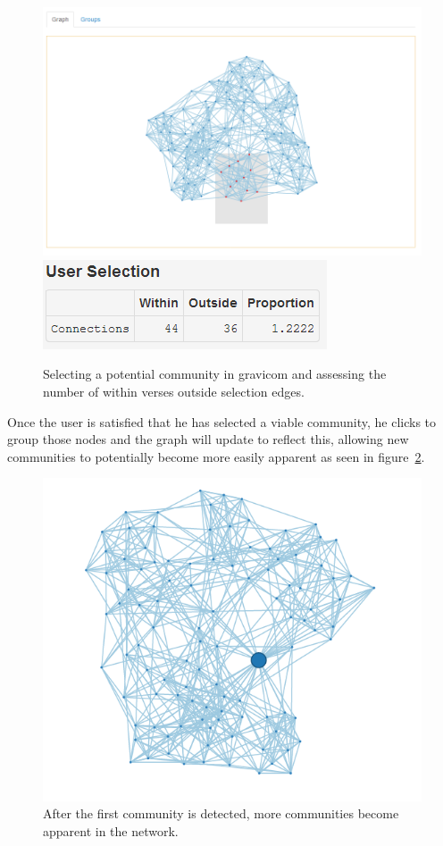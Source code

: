 \documentclass{article}\usepackage[]{graphicx}\usepackage[]{color}
\begin{document}
\begin{figure}[hbtp]
\centering
\includegraphics[width=\textwidth]{images/football_2.png}
\includegraphics[]{images/football_3.png}
\caption{\label{fig:football_2} Selecting a potential community in gravicom and assessing the number of within verses outside selection edges.}
\end{figure}

Once the user is satisfied that he has selected a viable community, he clicks to group those nodes and the graph will update to reflect this, allowing new communities to potentially become more easily apparent as seen in figure~\ref{fig:football_4}. 

\begin{figure}[hbtp]
\centering
\includegraphics[width=\textwidth]{images/football_4.png}
\caption{\label{fig:football_4} After the first community is detected, more communities become apparent in the network.}
\end{figure}
\end{document}
